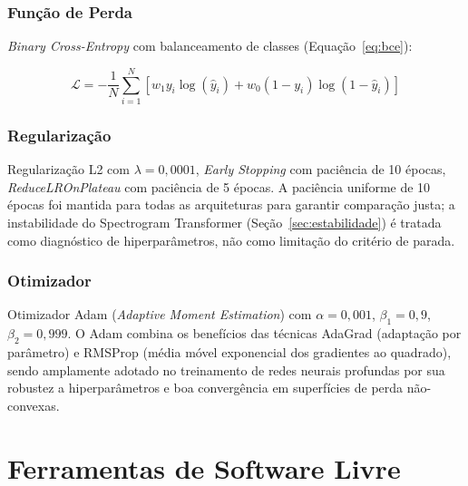 \documentclass[12pt,a4paper]{article}
\begin{document}
\subsubsection{Função de Perda}

\textit{Binary Cross-Entropy} com balanceamento de classes
(Equação~\ref{eq:bce}):

\begin{equation}
\label{eq:bce}
\mathcal{L} = -\frac{1}{N}\sum_{i=1}^{N}\left[
w_1 y_i\log(\hat{y}_i) + w_0(1-y_i)\log(1-\hat{y}_i)\right]
\end{equation}

\subsubsection{Regularização}

Regularização L2 com $\lambda=0{,}0001$, \textit{Early Stopping} com
paciência de 10 épocas, \textit{ReduceLROnPlateau} com paciência de 5 épocas.
A paciência uniforme de 10 épocas foi mantida para todas as arquiteturas para
garantir comparação justa; a instabilidade do Spectrogram Transformer
(Seção~\ref{sec:estabilidade}) é tratada como diagnóstico de hiperparâmetros,
não como limitação do critério de parada.

\subsubsection{Otimizador}

Otimizador Adam (\textit{Adaptive Moment Estimation}) \cite{kingma2015adam}
com $\alpha=0{,}001$, $\beta_1=0{,}9$, $\beta_2=0{,}999$. O Adam combina os
benefícios das técnicas AdaGrad (adaptação por parâmetro) e RMSProp (média
móvel exponencial dos gradientes ao quadrado), sendo amplamente adotado no
treinamento de redes neurais profundas por sua robustez a hiperparâmetros e
boa convergência em superfícies de perda não-convexas.

\section{Ferramentas de Software Livre}
\label{sec:software}
\end{document}

